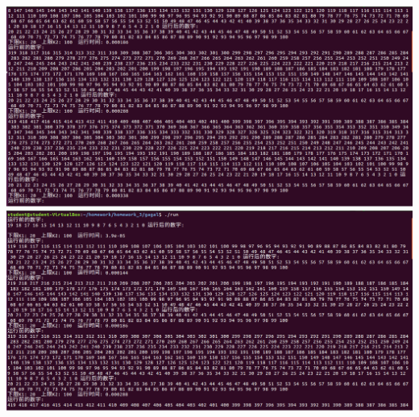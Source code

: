 \documentclass{ctexart}
\begin{document}
\begin{center}
  \includegraphics[scale=0.25]{5.png}
  \includegraphics[scale=0.25]{6.png}
\end{center}
\end{document}
